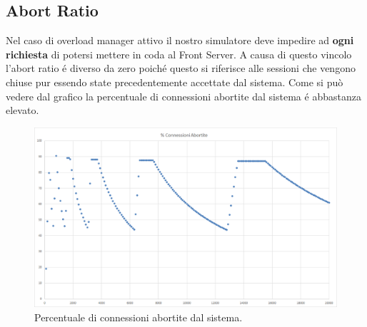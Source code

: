 \subsection{Abort Ratio}
Nel caso di overload manager attivo il nostro simulatore deve impedire ad \textbf{ogni richiesta} di potersi mettere in coda al Front Server.
A causa di questo vincolo l'abort ratio \'e diverso da zero poich\'e questo si riferisce alle sessioni che vengono chiuse pur essendo state precedentemente accettate dal sistema. Come si può vedere dal grafico la percentuale di connessioni abortite dal sistema \'e abbastanza elevato.
\begin{figure}[H]
	\begin{center}
	\includegraphics[scale=0.4]{img/abort_ratio.png}
	\caption[Percentuale di connessioni abortite dal sistema.]{Percentuale di connessioni abortite dal sistema.}
	\label{fig:confr_distrib}
	\end{center}
\end{figure}

